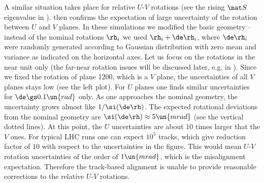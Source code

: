 A similar situation takes place for relative $U$-$V$ rotations (see the rising $\mat S$ eigenvalue in ).  then confirms the expectation of large uncertainty of the rotation between $U$ and $V$ planes. In these simulations we modified the basic geometry -- instead of the nominal rotations $\rh_i$ we used $\rh_i + \de\rh_i$, where $\de\rh_i$ were randomly generated according to Gaussian distribution with zero mean and variance as indicated on the horizontal axes. Let us focus on the rotations in the near unit only (the far-near rotation issues will be discussed later, e.g. in ). Since we fixed the rotation of plane 1200, which is a $V$ plane, the uncertainties of all $V$ planes stays low (see the left plot). For $U$ planes one finds similar uncertainties for $\de\gs 0.1\un{rad}$ only. As one approaches the nominal geometry, the uncertainty grows almost like $1/\si(\de\rh)$. The expected rotational deviations from the nominal geometry are $\si(\de\rh) \approx 5\un{mrad}$ (see the vertical dotted lines). At this point, the $U$ uncertainties are about $10$ times larger that the $V$ ones. For typical LHC runs one can expect $10^5$ tracks, which give reduction factor of $10$ with respect to the uncertainties in the figure. This would mean $U$-$V$ rotation uncertainties of the order of $1\un{mrad}$, which is the misalignment expectation. Therefore the track-based alignment is unable to provide reasonable corrections to the relative $U$-$V$ rotations.


